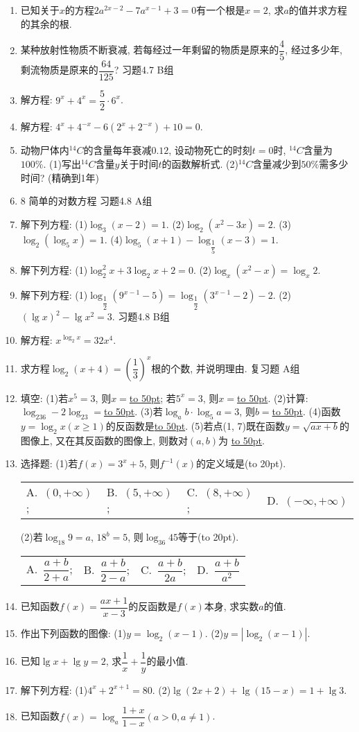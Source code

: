 \documentclass[10pt,a4paper]{article}
\newcommand{\blank}[1]{\underline{\hbox to #1pt{}}}
\newcommand{\bracket}[1]{(\hbox to #1pt{})}
\newcommand{\fourch}[4]{\par\begin{tabular}{p{.23\textwidth}p{.23\textwidth}p{.23\textwidth}p{.23\textwidth}}
A.~#1 &B.~#2& C.~#3& D.~#4
\end{tabular}}
\begin{document}
\begin{enumerate}[1.]
\item 已知关于$x$的方程$2a^{2x-2}-7a^{x-1}+3=0$有一个根是$x=2$, 求$a$的值并求方程的其余的根.
\item 某种放射性物质不断衰减, 若每经过一年剩留的物质是原来的$\dfrac 45$, 经过多少年, 剩流物质是原来的$\dfrac{64}{125}$?
习题4.7  B组
\item 解方程: $9^x+4^x=\dfrac 52\cdot 6^x$.
\item 解方程: $4^x+4^{-x}-6(2^x+2^{-x})+10=0$.
\item 动物尸体内$^{14}C$的含量每年衰减$0.12$, 设动物死亡的时刻$t=0$时, $^{14}C$含量为$100\%$.
(1)写出$^{14}C$含量$y$关于时间$t$的函数解析式.
(2)$^{14}C$含量减少到$50\%$需多少时间? (精确到1年)
\item 8  简单的对数方程
习题4.8  A组
\item 解下列方程:
(1)$\log _3(x-2)=1$.					(2)$\log _2(x^2-3x)=2$.
(3)$\log _2(\log _5x)=1$.				(4)$\log _5(x+1)-\log _{\dfrac 15}(x-3)=1$.
\item 解下列方程:
(1)$\log _2^2x+3\log _2x+2=0$.			(2)$\log _x(x^2-x)=\log _x2$.
\item 解下列方程:
(1)$\log _{\dfrac 12}(9^{x-1}-5)=\log _{\dfrac 12}(3^{x-1}-2)-2$.	(2)$(\lg x)^2-\lg x^2=3$.
习题4.8  B组
\item 解方程: $x^{\log _2x}=32x^4$.
\item 求方程$\log _2(x+4)=(\dfrac 13)^x$根的个数, 并说明理由.
复习题
A组
\item 填空:
(1)若$x^5=3$, 则$x=$\blank{50}; 若$5^x=3$, 则$x=$\blank{50}.
(2)计算: $\log _236-2\log _23=$\blank{50}.
(3)若$\log _ab\cdot \log _5a=3$, 则$b=$\blank{50}.
(4)函数$y=\log _2x(x\ge 1)$的反函数是\blank{50}.
(5)若点(1, 7)既在函数$y=\sqrt {ax+b}$的图像上, 又在其反函数的图像上, 则数对$(a,b)$为
\blank{50}.
\item 选择题:
(1)若$f(x)=3^x+5$, 则$f^{-1}(x)$的定义域是\bracket{20}.
\fourch{$(0,+\infty)$;}{$(5,+\infty)$;}{$(8,+\infty)$;}{$(-\infty ,+\infty)$}
(2)若$\log _{18}9=a$, $18^b=5$, 则$\log _{36}45$等于\bracket{20}.
\fourch{$\dfrac{a+b}{2+a}$;}{$\dfrac{a+b}{2-a}$;}{$\dfrac{a+b}{2a}$;}{$\dfrac{a+b}{a^2}$}
\item 已知函数$f(x)=\dfrac{ax+1}{x-3}$的反函数是$f(x)$本身, 求实数$a$的值.
\item 作出下列函数的图像:
(1)$y=\log _2(x-1)$.					(2)$y=|\log _2(x-1)|$.
\item 已知$\lg x+\lg y=2$, 求$\dfrac 1x+\dfrac 1y$的最小值.
\item 解下列方程:
(1)$4^x+2^{x+1}=80$.					(2)$\lg (2x+2)+\lg (15-x)=1+\lg 3$.
\item 已知函数$f(x)=\log _a\dfrac{1+x}{1-x}(a>0,a\ne 1)$.

\end{enumerate}
\end{document}
